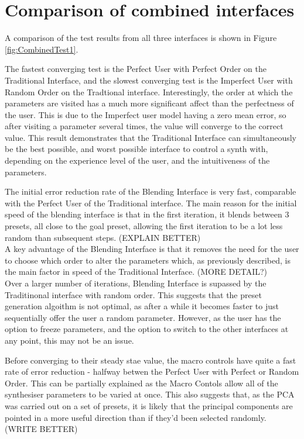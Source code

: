\documentclass[11pt, oneside]{report}   	%
\begin{document}
\section{Comparison of combined interfaces}
A comparison of the test results from all three interfaces is shown in Figure \ref{fig:CombinedTest1}. 

The fastest converging test is the Perfect User with Perfect Order on the Traditional Interface, and the slowest converging test is the Imperfect User with Random Order on the Tradtional interface. Interestingly, the order at which the parameters are visited has a much more significant affect than the perfectness of the user. This is due to the Imperfect user model having a zero mean error, so after visiting a parameter several times, the value will converge to the correct value. This result demonstrates that the Traditional Interface can simultaneously be the best possible, and worst possible interface to control a synth with, depending on the experience level of the user, and the intuitiveness of the parameters.

The initial error reduction rate of the Blending Interface is very fast, comparable with the Perfect User of the Traditional interface. The main reason for the initial speed of the blending interface is that in the first iteration, it blends between 3 presets, all close to the goal preset, allowing the first iteration to be a lot less random than subsequent steps. (EXPLAIN BETTER)\\
A key advantage of the Blending Interface is that it removes the need for the user to choose which order to alter the parameters which, as previously described, is the main factor in speed of the Traditional Interface. (MORE DETAIL?)\\
 Over a larger number of iterations, Blending Interface is supassed by the Traditinonal interface with random order. This suggests that the preset generation algoithm is not optimal, as after a while it becomes faster to just sequentially offer the user a random parameter. However, as the user has the option to freeze parameters, and the option to switch to the other interfaces at any point, this may not be an issue. 
 

Before converging to their steady stae value, the macro controls have quite a fast rate of error reduction - halfway betwen the Perfect User with Perfect or Random Order. This can be partially explained as the Macro Contols allow all of the synthesiser parameters to be varied at once. This also suggests that, as the PCA was carried out on a set of presets, it is likely that the principal components are pointed in a more useful direction than if they'd been selected randomly. (WRITE BETTER)
\end{document}
